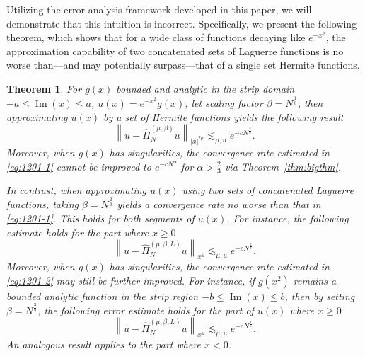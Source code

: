 \documentclass[pdflatex,sn-aps]{sn-jnl}%
\theoremstyle{thmstyleone}%
\newtheorem{theorem}{Theorem}[section]%
\theoremstyle{thmstyletwo}%
\theoremstyle{thmstylethree}%
\begin{document}
Utilizing the error analysis framework developed in this paper, we will demonstrate that this intuition is incorrect. Specifically, we present the following theorem, which shows that for a wide class 
of functions decaying like $e^{-x^2}$, the approximation capability of two concatenated sets of Laguerre functions is no worse than---and may potentially surpass---that of a single set Hermite functions.

\begin{theorem}\label{thm:1201-1}
  For $g(x)$ bounded and analytic in the strip domain $-a \leqslant \operatorname{Im}(x) \leqslant a$,
  $u(x) = e^{-x^2}g(x)$, let scaling factor $\beta = N^{\frac{1}{6}}$, then approximating $u(x)$
  by a set of Hermite functions yields the following result
  \begin{equation}\label{eq:1201-1}
    \left\|u-\widehat{\Pi}_N^{\left(\mu, \beta\right)}u\right\|_{|x|^{2 \mu}} \lesssim_{\mu, u} e^{-c N^{\frac{2}{3}}}.
  \end{equation}
  Moreover, when $g(x)$ has singularities, the convergence rate estimated in
  \eqref{eq:1201-1} cannot be improved to $e^{-cN^\alpha}$ for $\alpha > \frac{2}{3}$ via Theorem~\ref{thm:bigthm}.
  
  In contrast, when approximating $u(x)$ using two sets of concatenated Laguerre functions, taking $\beta = N^{\frac{2}{3}}$ yields a convergence rate  no worse than that in \eqref{eq:1201-1}. This holds for both segments of $u(x)$. For instance, the following estimate holds for the part where $x \geqslant 0$
  \begin{equation}\label{eq:1201-2}
    \left\|u-\widehat{\Pi}_N^{\left(\mu, \beta, L\right)} u\right\|_{x^{\mu}} \lesssim_{\mu, u} e^{-c N^{\frac{2}{3}}}.
  \end{equation}
  Moreover, when $g(x)$ has singularities, the convergence rate estimated in
  \eqref{eq:1201-2} may still be further improved. For instance, if $g(x^2)$ remains a bounded analytic function in the strip region $-b \leqslant \operatorname{Im}(x) \leqslant b$, then by setting
  $\beta = N^{\frac{3}{5}}$, the following error estimate holds for the part of $u(x)$ where $x \geqslant 0$
  \begin{equation}\label{eq:1201-3}
    \left\|u-\widehat{\Pi}_N^{\left(\mu, \beta, L\right)}u\right\|_{x^{\mu}} \lesssim_{\mu, u} e^{-c N^{\frac{4}{5}}}.
  \end{equation}
  An analogous result applies to the part where $x < 0$.
\end{theorem}
\end{document}
